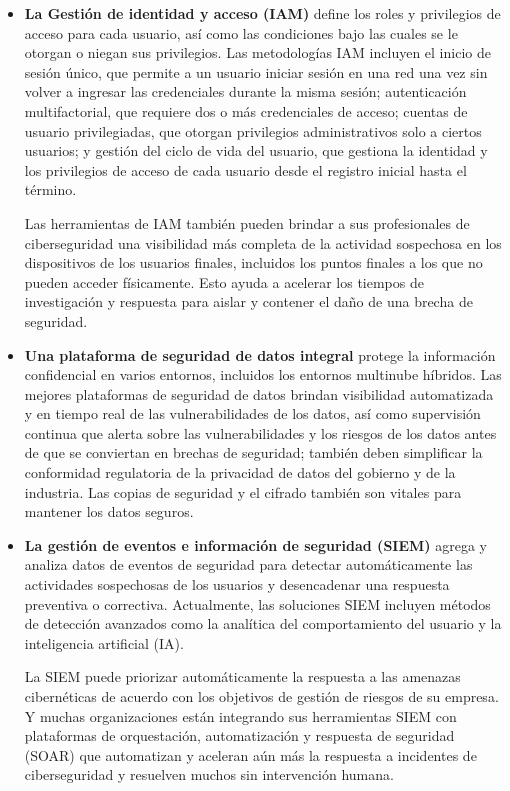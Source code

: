 \documentclass[12pt]{article}
\begin{document}
  \begin{itemize}
    \item \textbf{La Gestión de identidad y acceso (IAM)} define los roles y privilegios de acceso para cada usuario, así como las condiciones bajo las cuales se le otorgan o niegan sus privilegios. Las metodologías IAM incluyen el inicio de sesión único, que permite a un usuario iniciar sesión en una red una vez sin volver a ingresar las credenciales durante la misma sesión; autenticación multifactorial, que requiere dos o más credenciales de acceso; cuentas de usuario privilegiadas, que otorgan privilegios administrativos solo a ciertos usuarios; y gestión del ciclo de vida del usuario, que gestiona la identidad y los privilegios de acceso de cada usuario desde el registro inicial hasta el término.

    Las herramientas de IAM también pueden brindar a sus profesionales de ciberseguridad una visibilidad más completa de la actividad sospechosa en los dispositivos de los usuarios finales, incluidos los puntos finales a los que no pueden acceder físicamente. Esto ayuda a acelerar los tiempos de investigación y respuesta para aislar y contener el daño de una brecha de seguridad.
    \item \textbf{Una plataforma de seguridad de datos integral} protege la información confidencial en varios entornos, incluidos los entornos multinube híbridos. Las mejores plataformas de seguridad de datos brindan visibilidad automatizada y en tiempo real de las vulnerabilidades de los datos, así como supervisión continua que alerta sobre las vulnerabilidades y los riesgos de los datos antes de que se conviertan en brechas de seguridad; también deben simplificar la conformidad regulatoria de la privacidad de datos del gobierno y de la industria. Las copias de seguridad y el cifrado también son vitales para mantener los datos seguros.
    \item \textbf{La gestión de eventos e información de seguridad (SIEM)} agrega y analiza datos de eventos de seguridad para detectar automáticamente las actividades sospechosas de los usuarios y desencadenar una respuesta preventiva o correctiva. Actualmente, las soluciones SIEM incluyen métodos de detección avanzados como la analítica del comportamiento del usuario y la inteligencia artificial (IA).
    
    La SIEM puede priorizar automáticamente la respuesta a las amenazas cibernéticas de acuerdo con los objetivos de gestión de riesgos de su empresa. Y muchas organizaciones están integrando sus herramientas SIEM con plataformas de orquestación, automatización y respuesta de seguridad (SOAR) que automatizan y aceleran aún más la respuesta a incidentes de ciberseguridad y resuelven muchos sin intervención humana.
  \end{itemize}  
\end{document}
